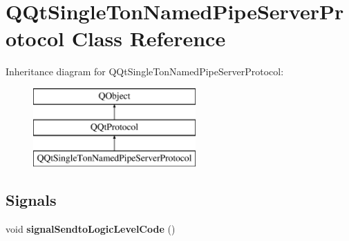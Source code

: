 \hypertarget{class_q_qt_single_ton_named_pipe_server_protocol}{}\section{Q\+Qt\+Single\+Ton\+Named\+Pipe\+Server\+Protocol Class Reference}
\label{class_q_qt_single_ton_named_pipe_server_protocol}
Inheritance diagram for Q\+Qt\+Single\+Ton\+Named\+Pipe\+Server\+Protocol\+:\begin{figure}[H]
\begin{center}
\leavevmode
\includegraphics[height=3.000000cm]{class_q_qt_single_ton_named_pipe_server_protocol}
\end{center}
\end{figure}
\subsection*{Signals}
\begin{DoxyCompactItemize}
\item 
\mbox{\label{class_q_qt_single_ton_named_pipe_server_protocol_a6f48511a5bc32c2ca6501a6a80b11ab1}} 
void {\bfseries signal\+Sendto\+Logic\+Level\+Code} ()
\end{DoxyCompactItemize}
